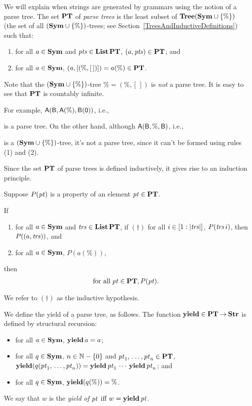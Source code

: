 %
%
%
We will explain when strings are generated by grammars using the
notion of a parse tree.  The set $\mathbf{PT}$ of \emph{parse trees} is the
least subset of $\mathbf{Tree}(\mathbf{Sym}\cup\{\%\})$ (the set of all
$(\mathbf{Sym}\cup\{\%\})$-trees; see
Section~\ref{TreesAndInductiveDefinitions}) such that:
\begin{enumerate}[\quad(1)]
\item for all $a\in\mathbf{Sym}$ and ${\it pts}\in\mathbf{List}\,\mathbf{PT}$, $(a,{\it pts})\in\mathbf{PT}$; and

\item for all $a\in\mathbf{Sym}$, $(a,[(\%,[\,])]) = a(\%)\in\mathbf{PT}$.
\end{enumerate}
Note that the $(\mathbf{Sym}\cup\{\%\})$-tree $\% = (\%,[\,])$ is
\emph{not} a parse tree.
It is easy to see that $\mathbf{PT}$ is countably infinite.

For example, $\mathsf{A}(\mathsf{B},\mathsf{A}(\%),\mathsf{B}(\mathsf{0}))$, i.e.,
\begin{center}

\end{center}
is a parse tree.  On the other hand,
although $\mathsf{A}(\mathsf{B},\%,\mathsf{B})$, i.e.,
\begin{center}

\end{center}
is a $(\mathbf{Sym}\cup\{\%\})$-tree, it's not a parse tree, since it
can't be formed using rules (1) and (2).

Since the set $\mathbf{PT}$ of parse trees is defined inductively, it gives
rise to an induction principle.
%

\begin{theorem}
Suppose $P({\it pt})$ is a property of an element ${\it pt}\in\mathbf{PT}$.

If
\begin{enumerate}[\quad(1)]
\item for all $a\in\mathbf{Sym}$ and ${\it trs}\in\mathbf{List}\,\mathbf{PT}$, if $(\dag)$ for all
  $i\in[1:|{\it trs}|]$, $P({\it trs}\,i)$, then $P((a,{\it trs}))$, and

\item for all $a\in\mathbf{Sym}$, $P(a(\%))$,
\end{enumerate}
then
\begin{gather*}
\allowbreak\mbox{for all}\allowbreak\;{\it pt}\in\mathbf{PT},P({\it pt}) .
\end{gather*}
\end{theorem}
We refer to $(\dag)$ as the inductive hypothesis.

%
%
We define the yield of a parse tree, as follows.  The function
$\mathbf{yield}\in\mathbf{PT}\mathbin{\to}\mathbf{Str}$ is defined by structural recursion:
\begin{itemize}
\item for all $a\in\mathbf{Sym}$, $\mathbf{yield}\,a=a$;

\item for all $q\in\mathbf{Sym}$, $n\in\mathbb{N}-\{0\}$ and
${\it pt}_1,\,\ldots,{\it pt}_n\in\mathbf{PT}$,
$\mathbf{yield}(q({\it pt}_1,\,\ldots,{\it pt}_n)) =
\mathbf{yield}\,{\it pt}_1\,\cdots\,\mathbf{yield}\,{\it pt}_n$; and

\item for all $q\in\mathbf{Sym}$, $\mathbf{yield}(q(\%))=\%$.
\end{itemize}
We say that $w$ is the \emph{yield of} ${\it pt}$ iff
$w=\mathbf{yield}\,{\it pt}$.


